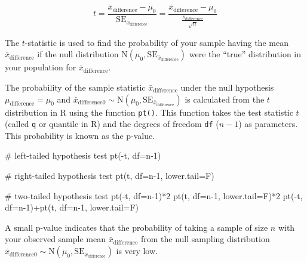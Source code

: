 \documentclass[
  letterpaper,
  DIV=11,
  numbers=noendperiod]{scrartcl}
\newenvironment{Shaded}{\begin{snugshade}}{\end{snugshade}}
\newcommand{\AttributeTok}[1]{\textcolor[rgb]{0.40,0.45,0.13}{#1}}
\newcommand{\CommentTok}[1]{\textcolor[rgb]{0.37,0.37,0.37}{#1}}
\newcommand{\DecValTok}[1]{\textcolor[rgb]{0.68,0.00,0.00}{#1}}
\newcommand{\FunctionTok}[1]{\textcolor[rgb]{0.28,0.35,0.67}{#1}}
\newcommand{\NormalTok}[1]{\textcolor[rgb]{0.00,0.23,0.31}{#1}}
\newcommand{\SpecialCharTok}[1]{\textcolor[rgb]{0.37,0.37,0.37}{#1}}
\begin{document}
\[
t=\frac{\bar{x}_{\text{difference}}-\mu_0}{\text{SE}_{\bar{x}_{\text{difference}}}}=\frac{\bar{x}_{\text{difference}}-\mu_0}{\frac{s_{\text{difference}}}{\sqrt{n}}}
\]

The \(t\)-statistic is used to find the probability of your sample
having the mean \(\bar{x}_{\text{difference}}\) if the null distribution
\(\text{N}\left(\mu_0, \text{SE}_{\bar{x}_{\text{difference}}}\right)\)
were the ``true'' distribution in your population for
\(\bar{x}_{\text{difference}}\).

The probability of the sample statistic \(\bar{x}_{\text{difference}}\)
under the null hypothesis \(\mu_{\text{difference}}=\mu_0\) and
\(\bar{x}_{\text{difference}0} \sim \text{N}\left(\mu_0, \text{SE}_{\bar{x}_{\text{difference}}}\right)\)
is calculated from the \(t\) distribution in R using the function
\texttt{pt()}. This function takes the test statistic \(t\) (called
\texttt{q} or quantile in R) and the degrees of freedom \texttt{df}
(\(n-1\)) as parameters. This probability is known as the p-value.

\begin{Shaded}
\begin{Highlighting}[]
\CommentTok{\# left{-}tailed hypothesis test}
\FunctionTok{pt}\NormalTok{(}\SpecialCharTok{{-}}\NormalTok{t, }\AttributeTok{df=}\NormalTok{n}\DecValTok{{-}1}\NormalTok{)}

\CommentTok{\# right{-}tailed hypothesis test}
\FunctionTok{pt}\NormalTok{(t, }\AttributeTok{df=}\NormalTok{n}\DecValTok{{-}1}\NormalTok{, }\AttributeTok{lower.tail=}\NormalTok{F)}

\CommentTok{\# two{-}tailed hypothesis test}
\FunctionTok{pt}\NormalTok{(}\SpecialCharTok{{-}}\NormalTok{t, }\AttributeTok{df=}\NormalTok{n}\DecValTok{{-}1}\NormalTok{)}\SpecialCharTok{*}\DecValTok{2}
\FunctionTok{pt}\NormalTok{(t, }\AttributeTok{df=}\NormalTok{n}\DecValTok{{-}1}\NormalTok{, }\AttributeTok{lower.tail=}\NormalTok{F)}\SpecialCharTok{*}\DecValTok{2}
\FunctionTok{pt}\NormalTok{(}\SpecialCharTok{{-}}\NormalTok{t, }\AttributeTok{df=}\NormalTok{n}\DecValTok{{-}1}\NormalTok{)}\SpecialCharTok{+}\FunctionTok{pt}\NormalTok{(t, }\AttributeTok{df=}\NormalTok{n}\DecValTok{{-}1}\NormalTok{, }\AttributeTok{lower.tail=}\NormalTok{F)}
\end{Highlighting}
\end{Shaded}

A small p-value indicates that the probability of taking a sample of
size \(n\) with your observed sample mean
\(\bar{x}_{\text{difference}}\) from the null sampling distribution
\(\bar{x}_{\text{difference}0} \sim \text{N}\left(\mu_0, \text{SE}_{\bar{x}_{\text{difference}}}\right)\)
is very low.
\end{document}
